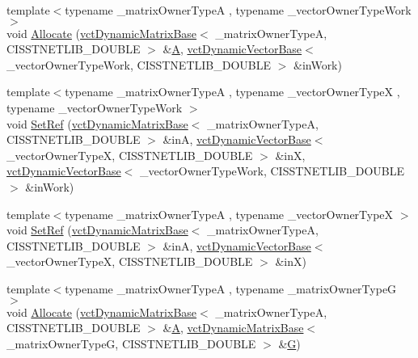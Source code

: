 \begin{DoxyCompactItemize}
\item 
{\footnotesize template$<$typename \+\_\+matrix\+Owner\+Type\+A , typename \+\_\+vector\+Owner\+Type\+Work $>$ }\\void \hyperlink{classnmr_l_sq_lin_solution_dynamic_a60f10aa3af469edc673ef555889a959c}{Allocate} (\hyperlink{classvct_dynamic_matrix_base}{vct\+Dynamic\+Matrix\+Base}$<$ \+\_\+matrix\+Owner\+Type\+A, C\+I\+S\+S\+T\+N\+E\+T\+L\+I\+B\+\_\+\+D\+O\+U\+B\+L\+E $>$ \&\hyperlink{classnmr_l_sq_lin_solution_dynamic_aa4a41abac141e2e55dd5cafb59169dfd}{A}, \hyperlink{classvct_dynamic_vector_base}{vct\+Dynamic\+Vector\+Base}$<$ \+\_\+vector\+Owner\+Type\+Work, C\+I\+S\+S\+T\+N\+E\+T\+L\+I\+B\+\_\+\+D\+O\+U\+B\+L\+E $>$ \&in\+Work)
\item 
{\footnotesize template$<$typename \+\_\+matrix\+Owner\+Type\+A , typename \+\_\+vector\+Owner\+Type\+X , typename \+\_\+vector\+Owner\+Type\+Work $>$ }\\void \hyperlink{classnmr_l_sq_lin_solution_dynamic_a7f70165a2f3b0f44ddb6e7bbca7a755c}{Set\+Ref} (\hyperlink{classvct_dynamic_matrix_base}{vct\+Dynamic\+Matrix\+Base}$<$ \+\_\+matrix\+Owner\+Type\+A, C\+I\+S\+S\+T\+N\+E\+T\+L\+I\+B\+\_\+\+D\+O\+U\+B\+L\+E $>$ \&in\+A, \hyperlink{classvct_dynamic_vector_base}{vct\+Dynamic\+Vector\+Base}$<$ \+\_\+vector\+Owner\+Type\+X, C\+I\+S\+S\+T\+N\+E\+T\+L\+I\+B\+\_\+\+D\+O\+U\+B\+L\+E $>$ \&in\+X, \hyperlink{classvct_dynamic_vector_base}{vct\+Dynamic\+Vector\+Base}$<$ \+\_\+vector\+Owner\+Type\+Work, C\+I\+S\+S\+T\+N\+E\+T\+L\+I\+B\+\_\+\+D\+O\+U\+B\+L\+E $>$ \&in\+Work)
\item 
{\footnotesize template$<$typename \+\_\+matrix\+Owner\+Type\+A , typename \+\_\+vector\+Owner\+Type\+X $>$ }\\void \hyperlink{classnmr_l_sq_lin_solution_dynamic_aa739cae11ba1d819d9a1f16d86f3d6ca}{Set\+Ref} (\hyperlink{classvct_dynamic_matrix_base}{vct\+Dynamic\+Matrix\+Base}$<$ \+\_\+matrix\+Owner\+Type\+A, C\+I\+S\+S\+T\+N\+E\+T\+L\+I\+B\+\_\+\+D\+O\+U\+B\+L\+E $>$ \&in\+A, \hyperlink{classvct_dynamic_vector_base}{vct\+Dynamic\+Vector\+Base}$<$ \+\_\+vector\+Owner\+Type\+X, C\+I\+S\+S\+T\+N\+E\+T\+L\+I\+B\+\_\+\+D\+O\+U\+B\+L\+E $>$ \&in\+X)
\item 
{\footnotesize template$<$typename \+\_\+matrix\+Owner\+Type\+A , typename \+\_\+matrix\+Owner\+Type\+G $>$ }\\void \hyperlink{classnmr_l_sq_lin_solution_dynamic_a98285ee643a5ab53cc31847592e85a0c}{Allocate} (\hyperlink{classvct_dynamic_matrix_base}{vct\+Dynamic\+Matrix\+Base}$<$ \+\_\+matrix\+Owner\+Type\+A, C\+I\+S\+S\+T\+N\+E\+T\+L\+I\+B\+\_\+\+D\+O\+U\+B\+L\+E $>$ \&\hyperlink{classnmr_l_sq_lin_solution_dynamic_aa4a41abac141e2e55dd5cafb59169dfd}{A}, \hyperlink{classvct_dynamic_matrix_base}{vct\+Dynamic\+Matrix\+Base}$<$ \+\_\+matrix\+Owner\+Type\+G, C\+I\+S\+S\+T\+N\+E\+T\+L\+I\+B\+\_\+\+D\+O\+U\+B\+L\+E $>$ \&\hyperlink{classnmr_l_sq_lin_solution_dynamic_a399cb314fb848d36f58c14830bad0c28}{G})

\end{DoxyCompactItemize}
